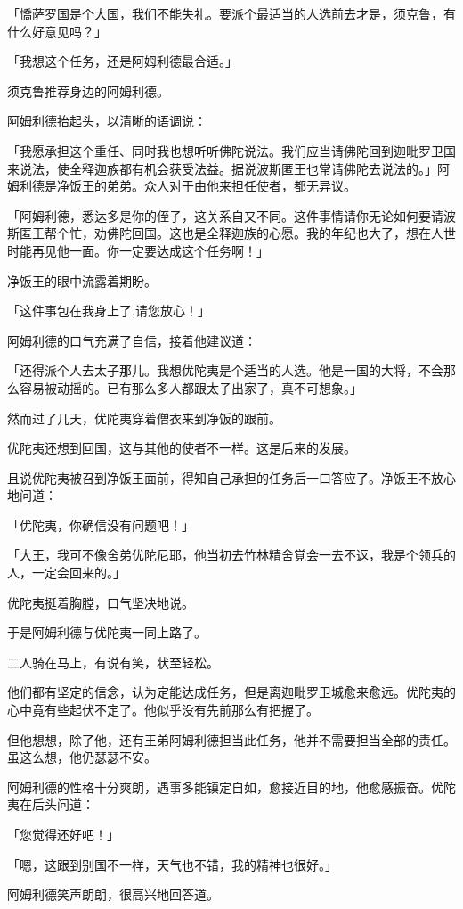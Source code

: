 \documentclass[twoside,openany]{book}
\begin{document}
「憍萨罗国是个大国，我们不能失礼。要派个最适当的人选前去才是，须克鲁，有什么好意见吗？」

「我想这个任务，还是阿姆利德最合适。」

须克鲁推荐身边的阿姆利德。

阿姆利德抬起头，以清晰的语调说：

「我愿承担这个重任、同时我也想听听佛陀说法。我们应当请佛陀回到迦毗罗卫国来说法，使全释迦族都有机会获受法益。据说波斯匿王也常请佛陀去说法的。」阿姆利德是净饭王的弟弟。众人对于由他来担任使者，都无异议。

「阿姆利德，悉达多是你的侄子，这关系自又不同。这件事情请你无论如何要请波斯匿王帮个忙，劝佛陀回国。这也是全释迦族的心愿。我的年纪也大了，想在人世时能再见他一面。你一定要达成这个任务啊！」

净饭王的眼中流露着期盼。

「这件事包在我身上了,请您放心！」

阿姆利德的口气充满了自信，接着他建议道：

「还得派个人去太子那儿。我想优陀夷是个适当的人选。他是一国的大将，不会那么容易被动摇的。已有那么多人都跟太子出家了，真不可想象。」

然而过了几天，优陀夷穿着僧衣来到净饭的跟前。

优陀夷还想到回国，这与其他的使者不一样。这是后来的发展。

且说优陀夷被召到净饭王面前，得知自己承担的任务后一口答应了。净饭王不放心地问道：

「优陀夷，你确信没有问题吧！」

「大王，我可不像舍弟优陀尼耶，他当初去竹林精舍覚会一去不返，我是个领兵的人，一定会回来的。」

优陀夷挺着胸膛，口气坚决地说。

于是阿姆利德与优陀夷一同上路了。

二人骑在马上，有说有笑，状至轻松。

他们都有坚定的信念，认为定能达成任务，但是离迦毗罗卫城愈来愈远。优陀夷的心中竟有些起伏不定了。他似乎没有先前那么有把握了。

但他想想，除了他，还有王弟阿姆利德担当此任务，他并不需要担当全部的责任。虽这么想，他仍瑟瑟不安。

阿姆利德的性格十分爽朗，遇事多能镇定自如，愈接近目的地，他愈感振奋。优陀夷在后头问道：

「您觉得还好吧！」

「嗯，这跟到别国不一样，天气也不错，我的精神也很好。」

阿姆利德笑声朗朗，很高兴地回答道。
\end{document}
